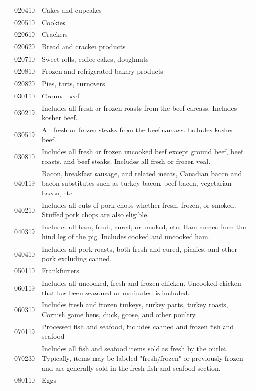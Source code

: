 \documentclass[
]{agujournal2019}
\begin{document}
\begin{table}
{\begin{tabular*}{\linewidth}{@{\extracolsep{\fill}}l|rl}
 & 020410 & Cakes and cupcakes \\ 
 & 020510 & Cookies \\ 
 & 020610 & Crackers \\ 
 & 020620 & Bread and cracker products \\ 
 & 020710 & Sweet rolls, coffee cakes, doughnuts \\ 
 & 020810 & Frozen and refrigerated bakery products \\ 
 & 020820 & Pies, tarts, turnovers \\ 
 & 030110 & Ground beef \\ 
 & 030219 & Includes all fresh or frozen roasts from the beef carcass. Includes kosher beef. \\ 
 & 030519 & All fresh or frozen steaks from the beef carcass. Includes kosher beef. \\ 
 & 030810 & Includes all fresh or frozen uncooked beef except ground beef, beef roasts, and beef steaks. Includes all fresh or frozen veal. \\ 
 & 040119 & Bacon, breakfast sausage, and related meats, Canadian bacon and bacon substitutes such as turkey bacon, beef bacon, vegetarian bacon, etc. \\ 
 & 040210 & Includes all cuts of pork chops whether fresh, frozen, or smoked.  Stuffed pork chops are also eligible. \\ 
 & 040319 & Includes all ham, fresh, cured, or smoked, etc.  Ham comes from the hind leg of the pig.  Includes cooked and uncooked ham. \\ 
 & 040410 & Includes all pork roasts, both fresh and cured, picnics, and other pork excluding canned. \\ 
 & 050110 & Frankfurters \\ 
 & 060119 & Includes all uncooked, fresh and frozen chicken. Uncooked chicken that has been seasoned or marinated is included. \\ 
 & 060310 & Includes fresh and frozen turkeys, turkey parts, turkey roasts, Cornish game hens, duck, goose, and other poultry. \\ 
 & 070119 & Processed fish and seafood, includes canned and frozen fish and seafood \\ 
 & 070230 & Includes all fish and seafood items sold as fresh by the outlet. Typically, items may be labeled "fresh/frozen" or previously frozen and are generally sold in the fresh fish and seafood section. \\ 
 & 080110 & Eggs \\ 

\end{tabular*}}
\end{table}
\end{document}
